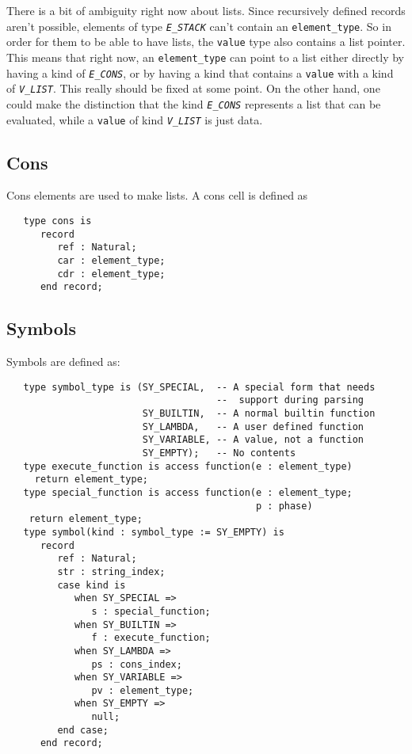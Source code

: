 \documentclass[10pt, openany]{book}
\newcommand{\constant}[1]{\emph{\texttt{#1}}}
\newcommand{\datatype}[1]{\texttt{#1}}
\begin{document}
There is a bit of ambiguity right now about lists.  Since recursively defined records aren't possible, elements of type  \constant{E\_STACK} can't contain an \datatype{element\_type}.  So in order for them to be able to have lists, the \datatype{value} type also contains a list pointer.  This means that right now, an \datatype{element\_type} can point to a list either directly by having a kind of \constant{E\_CONS}, or by having a kind that contains a \datatype{value} with a kind of \constant{V\_LIST}.  This really should be fixed at some point.  On the other hand, one could make the distinction that the kind \constant{E\_CONS} represents a list that can be evaluated, while a \datatype{value} of kind \constant{V\_LIST} is just data.

\subsection{Cons}
\label{sec:Cons}
Cons elements are used to make lists.  A cons cell is defined as
\begin{lstlisting}
   type cons is
      record
         ref : Natural;
         car : element_type;
         cdr : element_type;
      end record;
\end{lstlisting}

\subsection{Symbols}
\label{sec:Symbols}
Symbols are defined as:
\begin{lstlisting}
   type symbol_type is (SY_SPECIAL,  -- A special form that needs
                                     --  support during parsing
                        SY_BUILTIN,  -- A normal builtin function
                        SY_LAMBDA,   -- A user defined function
                        SY_VARIABLE, -- A value, not a function
                        SY_EMPTY);   -- No contents
   type execute_function is access function(e : element_type)
     return element_type;
   type special_function is access function(e : element_type;
                                            p : phase)
    return element_type;
   type symbol(kind : symbol_type := SY_EMPTY) is
      record
         ref : Natural;
         str : string_index;
         case kind is
            when SY_SPECIAL =>
               s : special_function;
            when SY_BUILTIN =>
               f : execute_function;
            when SY_LAMBDA =>
               ps : cons_index;
            when SY_VARIABLE =>
               pv : element_type;
            when SY_EMPTY =>
               null;
         end case;
      end record;
\end{lstlisting}
\end{document}
